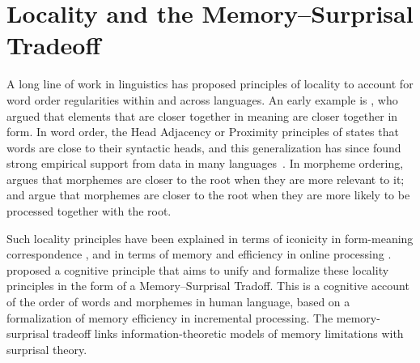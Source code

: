 \documentclass[11pt,letterpaper]{article}
\newcommand{\citep}{\parencite}
\newcommand{\citet}{\Textcite}
\begin{document}






\section{Locality and the Memory--Surprisal Tradeoff}

A long line of work in linguistics has proposed principles of locality to account for word order regularities within and across languages.
An early example is \citet{behaghel1932deutsche}, who argued that elements that are closer together in meaning are closer together in form.
In word order, the Head Adjacency or Proximity principles of \citet{frazier1985syntactic,rijkhoff-word-1986} states that words are close to their syntactic heads, and this generalization has since found strong empirical support from data in many languages~\citep[e.g.][]{hawkins-performance-1994,liu2008dependency, futrell-large-scale-2015-1, liu-dependency-2017}.
In morpheme ordering, \citet{bybee-morphology-1985} argues that morphemes are closer to the root when they are more relevant to it; \citet{hay2002speech} and \citet{plag2002the} argue that morphemes are closer to the root when they are more likely to be processed together with the root.

Such locality principles have been explained in terms of iconicity in form-meaning correspondence \citep{givon1985iconicity}, and in terms of memory and efficiency in online processing \citep{frazier1985syntactic, gibson1998linguistic, hawkins-efficiency-2003, futrell-noisy-context-2017}.
\citet{Hahn2020modeling} proposed a cognitive principle that aims to unify and formalize these locality principles in the form of a Memory--Surprisal Tradoff.
This is a cognitive account of the order of words and morphemes in human language, based on a formalization of memory efficiency in incremental processing.
The memory-surprisal tradeoff links information-theoretic models of memory limitations with surprisal theory.
\end{document}
